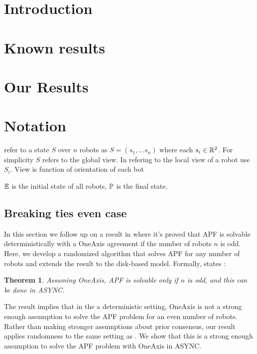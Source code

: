 \documentclass[preprint,10pt]{elsarticle}
\newtheorem{theorem}{Theorem}
\begin{document}

\section{Introduction}
\label{}

\section{Known results}
\label{}

\section{Our Results}
\label{}


\section{Notation} 
refer to a state $S$ over $n$ robots as $S = (s_1, \ldots s_n)$ where each $s_i \in \mathbb{R}^2$. For simplicity
$S$ refers to the global view. In refering to the local view of a robot use $S_i$. View is function of orientation
of each bot



$\mathbb{E}$ is the initial state of all robots, $\mathbb{P}$ is the final state.

\subsection{Breaking ties even case } 
	In this section we follow up on a result in \cite{flocchini12distrib} where it's proved that
	APF is solvable deterministically with a OneAxis agreement if the number of robots $n$ is
	odd. Here, we develop a randomized algorithm that solves APF for any number of robots
	and extends the result to the disk-based model. Formally, \cite{flocchini12distrib} states :
	\begin{theorem} 
		Assuming OneAxis, APF is solvable only if $n$ is odd, and this can be done in ASYNC.
	\end{theorem} 

	The result implies that in the a deterministic setting, OneAxis is not a strong enough 
	assumption to solve the APF problem for an even number of robots. Rather than making 
	stronger assumptions about prior consensus, our result applies randomness to the same setting
	as \cite{flocchini12distrib}. We show that this is a strong enough assumption to solve the 
	APF problem with OneAxis in ASYNC. 
\end{document}
